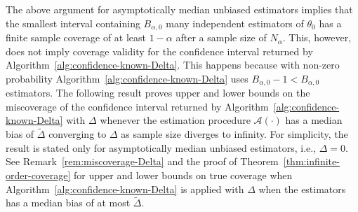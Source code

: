 \documentclass{article}
\numberwithin{myalgctr}{section}
\begin{document}
The above argument for asymptotically median unbiased estimators implies that the smallest interval containing $B_{\alpha,0}$ many independent estimators of $\theta_0$ has a finite sample coverage of at least $1 - \alpha$ after a sample size of $N_{\alpha}$. This, however, does not imply coverage validity for the confidence interval returned by Algorithm~\ref{alg:confidence-known-Delta}. This happens because with non-zero probability Algorithm~\ref{alg:confidence-known-Delta} uses $B_{\alpha,0} - 1 < B_{\alpha,0}$ estimators. The following result proves upper and lower bounds on the miscoverage of the confidence interval returned by Algorithm~\ref{alg:confidence-known-Delta} with $\Delta$ whenever the estimation procedure $\mathcal{A}(\cdot)$ has a median bias of $\widetilde{\Delta}$ converging to $\Delta$ as sample size diverges to infinity. For simplicity, the result is stated only for asymptotically median unbiased estimators, i.e., $\Delta = 0$. See Remark~\ref{rem:miscoverage-Delta} and the proof of Theorem~\ref{thm:infinite-order-coverage} for upper and lower bounds on true coverage when Algorithm~\ref{alg:confidence-known-Delta} is applied with $\Delta$ when the estimators has a median bias of at most $\widetilde{\Delta}$.
\end{document}

